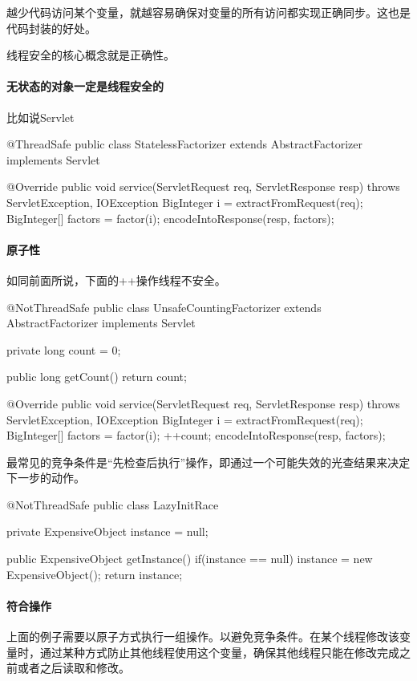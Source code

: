 越少代码访问某个变量，就越容易确保对变量的所有访问都实现正确同步。这也是代码封装的好处。


线程安全的核心概念就是正确性。

\paragraph{无状态的对象一定是线程安全的}比如说Servlet
\begin{Java}
@ThreadSafe
public class StatelessFactorizer extends AbstractFactorizer implements Servlet {
	
	@Override
	public void service(ServletRequest req, ServletResponse resp)
			throws ServletException, IOException {
		BigInteger i = extractFromRequest(req);
		BigInteger[] factors = factor(i);
		encodeIntoResponse(resp, factors);
	}

}
\end{Java}

\paragraph{原子性} 如同前面所说，下面的++操作线程不安全。

\begin{Java}
@NotThreadSafe
public class UnsafeCountingFactorizer extends AbstractFactorizer implements Servlet {

	private long count = 0;
	
	public long getCount(){ return count; }
	
	@Override
	public void service(ServletRequest req, ServletResponse resp)
			throws ServletException, IOException {
		BigInteger i = extractFromRequest(req);
		BigInteger[] factors = factor(i);
		++count;
		encodeIntoResponse(resp, factors);
	}
	
}
\end{Java}

最常见的竞争条件是“先检查后执行”操作，即通过一个可能失效的光查结果来决定下一步的动作。

\begin{Java}
@NotThreadSafe
public class LazyInitRace {

	private ExpensiveObject instance = null;
	
	public ExpensiveObject getInstance() {
		if(instance == null) {
			instance = new ExpensiveObject();
		}
		return instance;
	}
}
\end{Java}

\paragraph{符合操作}上面的例子需要以原子方式执行一组操作。以避免竞争条件。在某个线程修改该变量时，通过某种方式防止其他线程使用这个变量，确保其他线程只能在修改完成之前或者之后读取和修改。



